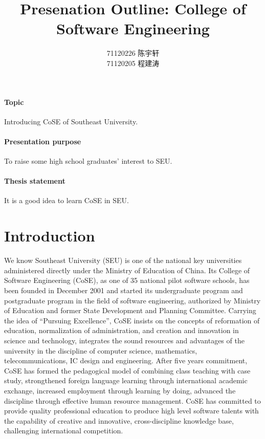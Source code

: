 \documentclass{article}
\title{Presenation Outline: College of Software Engineering}
\author{71120226 陈宇轩\\71120205 程建涛}
\begin{document}
    \maketitle

    \paragraph{Topic} Introducing CoSE of Southeast University.
    \paragraph{Presentation purpose} To raise some high school graduates' interest to
    SEU.
    \paragraph{Thesis statement} It is a good idea to learn CoSE in SEU.

    \section{Introduction}

    We know Southeast University (SEU) is one of the national key universities administered
    directly under the Ministry of Education of China. Its College of Software Engineering
    (CoSE), as one of 35 national pilot software schools, has been founded in December 2001
    and started its undergraduate program and postgraduate program in the field of software
    engineering, authorized by Ministry of Education and former State Development and Planning
    Committee. Carrying the idea of “Pursuing Excellence”, CoSE insists on the concepts of
    reformation of education, normalization of administration, and creation and innovation in
    science and technology, integrates the sound resources and advantages of the university in
    the discipline of computer science, mathematics, telecommunications, IC design and engineering.
    After five years commitment, CoSE has formed the pedagogical model of combining class teaching
    with case study, strongthened foreign language learning through international academic
    exchange, increased employment through learning by doing, advanced the discipline through
    effective human resource management. CoSE has committed to provide quality professional
    education to produce high level software talents with the capability of creative and innovative,
    cross-discipline knowledge base, challenging international competition.
\end{document}
